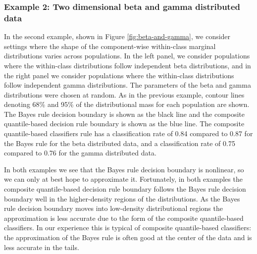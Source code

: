 \subsubsection*{Example 2:  Two dimensional beta and gamma distributed data}
\label{sec:beta-gamma-example}

In the second example, shown in Figure \ref{fig:beta-and-gamma}, we consider
settings where the shape of the component-wise within-class marginal
distributions varies across populations.  In the left panel, we consider
populations where the within-class distributions follow independent beta
distributions, and in the right panel we consider populations where the
within-class distributions follow independent gamma distributions.  The
parameters of the beta and gamma distributions were chosen at random.  As in the
previous example, contour lines denoting 68\% and 95\% of the distributional
mass for each population are shown.  The Bayes rule decision boundary is shown
as the black line and the composite quantile-based decision rule boundary is
shown as the blue line.  The composite quantile-based classifiers rule has a
classification rate of 0.84 compared to 0.87 for the Bayes rule for the beta
distributed data, and a classification rate of 0.75 compared to 0.76 for the
gamma distributed data.

In both examples we see that the Bayes rule decision boundary is nonlinear, so
we can only at best hope to approximate it.  Fortunately, in both examples the
composite quantile-based decision rule boundary follows the Bayes rule decision
boundary well in the higher-density regions of the distributions.  As the Bayes
rule decision boundary moves into low-density distributional regions the
approximation is less accurate due to the form of the composite quantile-based
classifiers.  In our experience this is typical of composite quantile-based
classifiers: the approximation of the Bayes rule is often good at the center of
the data and is less accurate in the tails.

